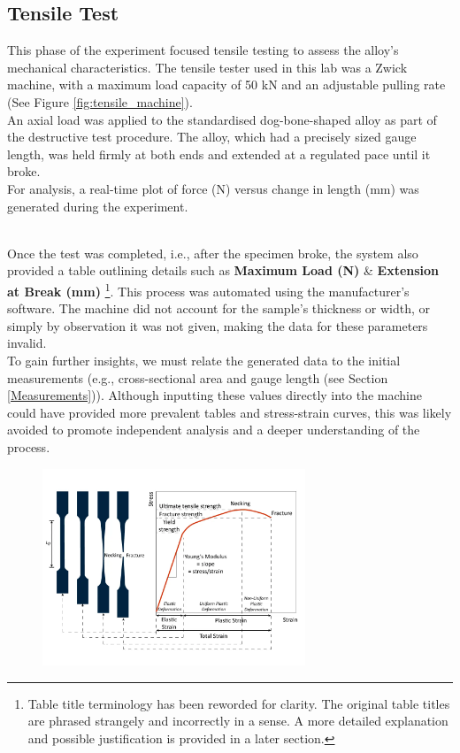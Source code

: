 \documentclass{article}
\begin{document}
\begin{minipage}{0.555\textwidth}
\subsection{Tensile Test}
This phase of the experiment focused tensile testing to assess the alloy's mechanical characteristics. The tensile tester used in this lab was a {Zwick machine}, with a maximum load capacity of 50 kN and an adjustable pulling rate (See Figure \ref{fig:tensile_machine}).\\[8pt]
An axial load was applied to the standardised dog-bone-shaped alloy as part of the destructive test procedure. The alloy, which had a precisely sized gauge length, was held firmly at both ends and extended at a regulated pace until it broke.\\[8pt]
For analysis, a real-time plot of force (N) versus change in length (mm) was generated during the experiment.
\end{minipage}\\[8pt]
Once the test was completed, i.e., after the specimen broke, the system also provided a table outlining details such as \textbf{Maximum Load (N)} \& \textbf{Extension at Break (mm)} \footnote{Table title terminology has been reworded for clarity. The original table titles are phrased strangely and incorrectly in a sense. A more detailed explanation and possible justification is provided in a later section.}. This process was automated using the manufacturer's software. The machine did not account for the sample's thickness or width, or simply by observation it was not given, making the data for these parameters invalid.\\[8pt]
To gain further insights, we must relate the generated data to the initial measurements (e.g., cross-sectional area and gauge length (see Section \ref{Measurements})). Although inputting these values directly into the machine could have provided more prevalent tables and stress-strain curves, this was likely avoided to promote independent analysis and a deeper understanding of the process.
\newpage
\begin{figure}[H]
    \centering    
    \includegraphics[width=0.7\textwidth]{images/simwiki-stress-strain-shape-evolution.png}
    \label{fig:alloys_next_graph}
\end{figure}
\end{document}
